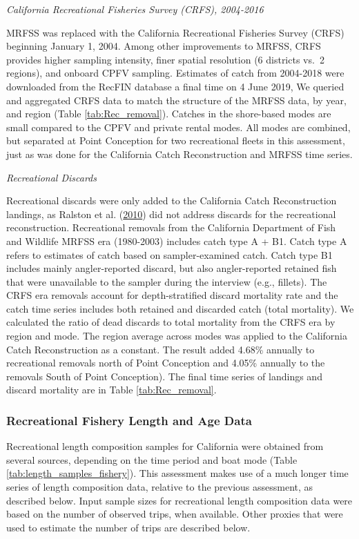 \documentclass[12pt,]{article}
\begin{document}
\emph{California Recreational Fisheries Survey (CRFS), 2004-2016}

MRFSS was replaced with the California Recreational Fisheries Survey
(CRFS) beginning January 1, 2004. Among other improvements to MRFSS,
CRFS provides higher sampling intensity, finer spatial resolution (6
districts vs.~2 regions), and onboard CPFV sampling. Estimates of catch
from 2004-2018 were downloaded from the RecFIN database a final time on
4 June 2019, We queried and aggregated CRFS data to match the structure
of the MRFSS data, by year, and region (Table \ref{tab:Rec_removal}).
Catches in the shore-based modes are small compared to the CPFV and
private rental modes. All modes are combined, but separated at Point
Conception for two recreational fleets in this assessment, just as was
done for the California Catch Reconstruction and MRFSS time series.

\emph{Recreational Discards}

Recreational discards were only added to the California Catch
Reconstruction landings, as Ralston et al.
(\protect\hyperlink{ref-Ralston2010}{2010}) did not address discards for
the recreational reconstruction. Recreational removals from the
California Department of Fish and Wildlife MRFSS era (1980-2003)
includes catch type A + B1. Catch type A refers to estimates of catch
based on sampler-examined catch. Catch type B1 includes mainly
angler-reported discard, but also angler-reported retained fish that
were unavailable to the sampler during the interview (e.g., fillets).
The CRFS era removals account for depth-stratified discard mortality
rate and the catch time series includes both retained and discarded
catch (total mortality). We calculated the ratio of dead discards to
total mortality from the CRFS era by region and mode. The region average
across modes was applied to the California Catch Reconstruction as a
constant. The result added 4.68\% annually to recreational removals
north of Point Conception and 4.05\% annually to the removals South of
Point Conception). The final time series of landings and discard
mortality are in Table \ref{tab:Rec_removal}.

\subsubsection{Recreational Fishery Length and Age
Data}\label{recreational-fishery-length-and-age-data}

Recreational length composition samples for California were obtained
from several sources, depending on the time period and boat mode (Table
\ref{tab:length_samples_fishery}). This assessment makes use of a much
longer time series of length composition data, relative to the previous
assessment, as described below. Input sample sizes for recreational
length composition data were based on the number of observed trips, when
available. Other proxies that were used to estimate the number of trips
are described below.
\end{document}
